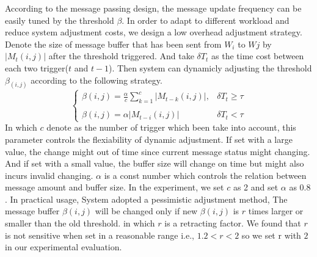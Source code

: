 {	
	According to the message passing design, the message update frequency can be easily tuned by the threshold $\beta$.
	In order to adapt to different workload and reduce system adjustment costs, we design a low overhead adjustment strategy. Denote the size of message buffer that has been sent from $W_i$ to $Wj$ by $|M_t(i,j)|$ after the threshold triggered. And take $\delta T_t$ as the time cost between each two trigger($t$ and $t-1$). Then system can dynamicly adjusting the threshold $\beta_{(i,j)}$ according to the following strategy.
	\begin{equation}
\left\{         
\begin{array}{lr}            
 \beta(i,j)=\frac{\alpha}{c}\sum_{k=1}^{c}| M_{t-k}(i,j)|,&   \delta T_t  \ge \tau  \\
 &\\
\beta(i,j)=\alpha| M_{t-i}(i,j)|  & \delta T_t  < \tau
\end{array}
\right.
\end{equation}
	In which $c$ denote as the number of trigger which been take into account, this parameter controls the flexiability of dynamic adjustment. If set with a large value, the change might out of time since current message status might changing. And if set with a small value, the buffer size will change on time but might also incurs invalid changing. $\alpha$ is a const number which controls the relation between message amount and buffer size. In the experiment, we set $c$ as 2 and set $\alpha$ as $0.8$. In practical usage, System adopted a pessimistic adjustment method, The message buffer $\beta(i,j)$ will be changed only if new $\beta(i,j)$ is $r$ times larger or smaller than the old threshold. in which $r$ is a retracting factor. We found that $r$ is not sensitive when set in a reasonable range i.e., $1.2<r<2$ so we set r with $2$ in our experimental evaluation.
}
